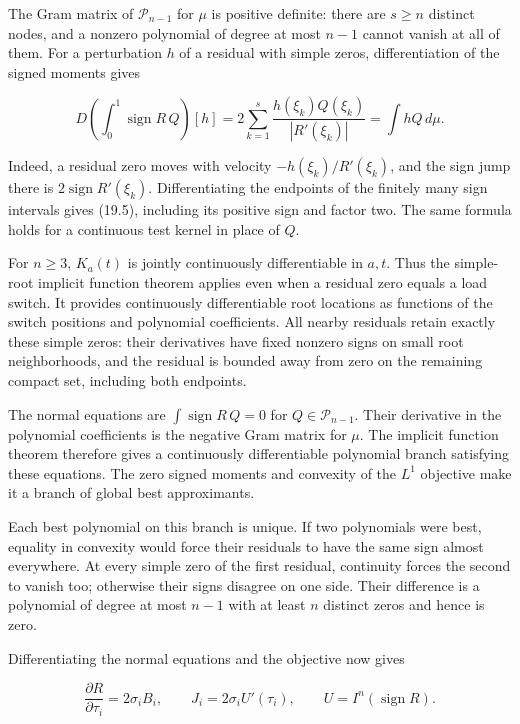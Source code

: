 \documentclass[11pt]{article}
\begin{document}
The Gram matrix of \(\mathcal P_{n-1}\) for \(\mu\) is positive
definite: there are \(s\ge n\) distinct nodes, and a nonzero polynomial
of degree at most \(n-1\) cannot vanish at all of them. For a
perturbation \(h\) of a residual with simple zeros, differentiation of
the signed moments gives

\[
D\left(\int_0^1\operatorname{sign}R\,Q\right)[h]
=2\sum_{k=1}^s\frac{h(\xi_k)Q(\xi_k)}{|R'(\xi_k)|}
=\int hQ\,d\mu.
\tag{19.5}
\]

Indeed, a residual zero moves with velocity \(-h(\xi_k)/R'(\xi_k)\), and
the sign jump there is \(2\operatorname{sign}R'(\xi_k)\).
Differentiating the endpoints of the finitely many sign intervals gives
(19.5), including its positive sign and factor two. The same formula
holds for a continuous test kernel in place of \(Q\).

For \(n\ge3\), \(K_a(t)\) is jointly continuously differentiable in
\(a,t\). Thus the simple-root implicit function theorem applies even
when a residual zero equals a load switch. It provides continuously
differentiable root locations as functions of the switch positions and
polynomial coefficients. All nearby residuals retain exactly these
simple zeros: their derivatives have fixed nonzero signs on small root
neighborhoods, and the residual is bounded away from zero on the
remaining compact set, including both endpoints.

The normal equations are \(\int\operatorname{sign}R\,Q=0\) for
\(Q\in\mathcal P_{n-1}\). Their derivative in the polynomial
coefficients is the negative Gram matrix for \(\mu\). The implicit
function theorem therefore gives a continuously differentiable
polynomial branch satisfying these equations. The zero signed moments
and convexity of the \(L^1\) objective make it a branch of global best
approximants.

Each best polynomial on this branch is unique. If two polynomials were
best, equality in convexity would force their residuals to have the same
sign almost everywhere. At every simple zero of the first residual,
continuity forces the second to vanish too; otherwise their signs
disagree on one side. Their difference is a polynomial of degree at most
\(n-1\) with at least \(n\) distinct zeros and hence is zero.

Differentiating the normal equations and the objective now gives

\[
\frac{\partial R}{\partial\tau_i}=2\sigma_iB_i,
\qquad J_i=2\sigma_iU'(\tau_i),
\qquad U=I^n(\operatorname{sign}R).
\tag{19.6}
\]
\end{document}

